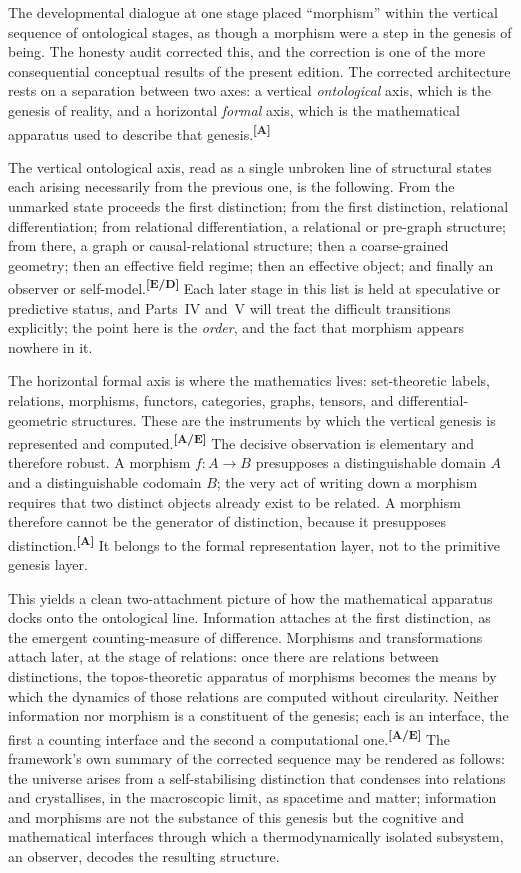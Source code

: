 \documentclass[12pt,a4paper,twoside]{article}
\theoremstyle{plain}
\theoremstyle{definition}
\theoremstyle{remark}
\newcommand{\catmark}[1]{\textsuperscript{\textsf{\textbf{[#1]}}}}
\begin{document}
The developmental dialogue at one stage placed ``morphism'' within the vertical sequence of ontological stages, as though a morphism were a step in the genesis of being. The honesty audit corrected this, and the correction is one of the more consequential conceptual results of the present edition. The corrected architecture rests on a separation between two axes: a vertical \emph{ontological} axis, which is the genesis of reality, and a horizontal \emph{formal} axis, which is the mathematical apparatus used to describe that genesis.\catmark{A}

The vertical ontological axis, read as a single unbroken line of structural states each arising necessarily from the previous one, is the following. From the unmarked state proceeds the first distinction; from the first distinction, relational differentiation; from relational differentiation, a relational or pre-graph structure; from there, a graph or causal-relational structure; then a coarse-grained geometry; then an effective field regime; then an effective object; and finally an observer or self-model.\catmark{E/D} Each later stage in this list is held at speculative or predictive status, and Parts~IV and~V will treat the difficult transitions explicitly; the point here is the \emph{order}, and the fact that morphism appears nowhere in it.

The horizontal formal axis is where the mathematics lives: set-theoretic labels, relations, morphisms, functors, categories, graphs, tensors, and differential-geometric structures. These are the instruments by which the vertical genesis is represented and computed.\catmark{A/E} The decisive observation is elementary and therefore robust. A morphism $f\colon A\to B$ presupposes a distinguishable domain $A$ and a distinguishable codomain $B$; the very act of writing down a morphism requires that two distinct objects already exist to be related. A morphism therefore cannot be the generator of distinction, because it presupposes distinction.\catmark{A} It belongs to the formal representation layer, not to the primitive genesis layer.

This yields a clean two-attachment picture of how the mathematical apparatus docks onto the ontological line. Information attaches at the first distinction, as the emergent counting-measure of difference. Morphisms and transformations attach later, at the stage of relations: once there are relations between distinctions, the topos-theoretic apparatus of morphisms becomes the means by which the dynamics of those relations are computed without circularity. Neither information nor morphism is a constituent of the genesis; each is an interface, the first a counting interface and the second a computational one.\catmark{A/E} The framework's own summary of the corrected sequence may be rendered as follows: the universe arises from a self-stabilising distinction that condenses into relations and crystallises, in the macroscopic limit, as spacetime and matter; information and morphisms are not the substance of this genesis but the cognitive and mathematical interfaces through which a thermodynamically isolated subsystem, an observer, decodes the resulting structure.
\end{document}
